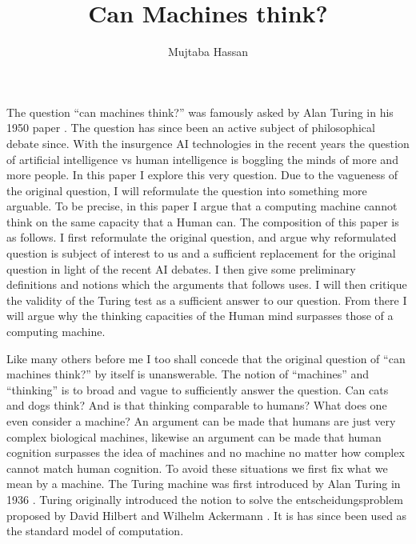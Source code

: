 \documentclass[11pt,a4paper]{article}
\title{Can Machines think?}
\author{Mujtaba Hassan}
\begin{document}
\maketitle

The question ``can machines think?'' was famously asked by Alan Turing in his 1950 paper \cite{Turing50}. The question has since been an active subject of philosophical debate since.
With the insurgence AI technologies in the recent years the question of artificial intelligence vs human intelligence is boggling the minds of more and more people. 
In this paper I explore this very question. Due to the vagueness of the original question, I will reformulate the question into something more arguable. To be precise, 
in this paper I argue that a computing machine cannot think on the same capacity that a Human can. The composition of this paper is as follows.
I first reformulate the original question, and argue why reformulated question is subject of interest to us and a sufficient replacement for the original question in light of the recent AI debates.
I then give some preliminary definitions and notions which the arguments that follows uses. I will then critique the validity of the Turing test as a sufficient answer to our question.
From there I will argue why the thinking capacities of the Human mind surpasses those of a computing machine.
\\\par\vspace*{0.5cm}
Like many others before me I too shall concede that the original question of ``can machines think?'' by itself is unanswerable.
The notion of ``machines'' and ``thinking'' is to broad and vague to sufficiently answer the question. Can cats and dogs think? And is that thinking comparable to humans?
What does one even consider a machine? An argument can be made that humans are just very complex biological machines, likewise an argument can be made that human cognition surpasses the idea of machines and no machine no matter how complex cannot match human cognition.
To avoid these situations we first fix what we mean by a machine. The Turing machine was first introduced by Alan Turing in 1936 \cite{Turing36}. 
Turing originally introduced the notion to solve the entscheidungsproblem proposed by David Hilbert and Wilhelm Ackermann \cite{hilbert}. It is has since been used as the standard model of computation.
\end{document}

